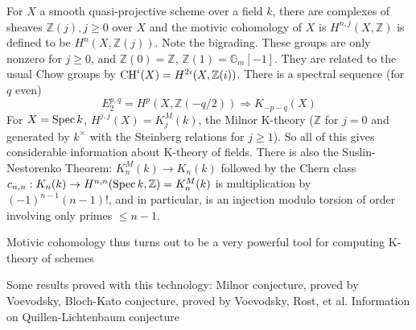 \documentclass[main]{subfiles}
\begin{document}
For $X$ a smooth quasi-projective scheme over a field $k$, there are complexes of sheaves $\mathbb Z(j),j\geq0$ over $X$ and the motivic cohomology of $X$ is $H^{n,j}(X,\mathbb Z)$ is defined to be $H^n(X,\mathbb Z(j))$. Note the bigrading. These groups are only nonzero for $j\geq0$, and $\mathbb Z(0)=\mathbb Z$, $\mathbb Z(1)=\mathbb G_m[-1]$. They are related to the usual Chow groups by $\operatorname{CH}^i(X)=H^{2i}(X,\mathbb Z(i))$. There is a spectral sequence (for $q$ even)
\[
E^{p,q}_2=H^p(X,\mathbb Z(-q/2))\Rightarrow K_{-p-q}(X)
\]
For $X=\operatorname{Spec} k$, $H^{j,j}(X)=K^M_j(k)$, the Milnor K-theory ($\mathbb Z$ for $j=0$ and generated by $k^\times$ with the Steinberg relations for $j\geq1$). So all of this gives considerable information about K-theory of fields. There is also the Suslin-Nestorenko Theorem: $K^M_n(k)\to K_n(k)$ followed by the Chern class $c_{n,n}:K_n(k)\to H^{n,n}(\operatorname{Spec} k,\mathbb Z)=K_n^M(k)$ is multiplication by $(-1)^{n-1}(n-1)!$, and in particular, is an injection modulo torsion of order involving only primes $\leq n-1$.

Motivic cohomology thus turns out to be a very powerful tool for computing K-theory of schemes

Some results proved with this technology: Milnor conjecture, proved by Voevodsky, Bloch-Kato conjecture, proved by Voevodsky, Rost, et al. Information on Quillen-Lichtenbaum conjecture
\end{document}
